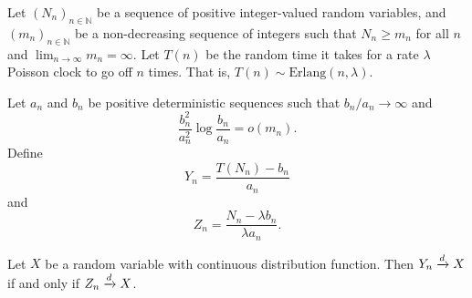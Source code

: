 	\begin{proposition}
	\label{prop:discrete vs continuous distributions}
		Let $(N_n)_{n \in \mathbb{N}}$ be a sequence of positive integer-valued random variables, and $(m_n)_{n \in \mathbb{N}}$ be a non-decreasing sequence of integers such that $N_n \geq m_n$ for all $n$ and $\lim_{n \rightarrow \infty} m_n = \infty$. Let $T(n)$ be the random time it takes for a rate $\lambda$ Poisson clock to go off $n$ times. That is, $T(n) \sim \mathrm{Erlang}(n, \lambda)$.

		Let $a_n$ and $b_n$ be positive deterministic sequences such that $b_n / a_n \rightarrow \infty$ and
		\begin{equation}
			\frac{b_n^2}{a_n^2}\log\frac{b_n}{a_n} = o(m_n).
			\label{eq:m_n a_n b_n constraint}
		\end{equation}
		Define
		\begin{equation}
			Y_n = \frac{T(N_n) - b_n}{a_n}
		\end{equation}
		and 
		\begin{equation}
			Z_n = \frac{N_n - \lambda b_n}{\lambda a_n}.
		\end{equation}

		Let $X$ be a random variable with continuous distribution function. Then $Y_n \xrightarrow{d} X$ if and only if $Z_n \xrightarrow{d} X$.


	\end{proposition}

